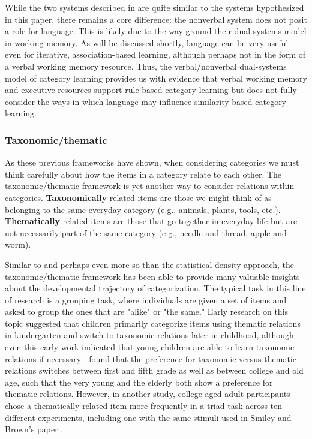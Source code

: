 \documentclass[../dissertation.tex]{subfiles}
\begin{document}
	While the two systems described in \citet{Minda2010} are quite similar to the systems hypothesized in this paper, there remains a core difference: the nonverbal system does not posit a role for language. This is likely due to the way \citet{Minda2010} ground their dual-systems model in working memory. As will be discussed shortly, language can be very useful even for iterative, association-based learning, although perhaps not in the form of a verbal working memory resource. Thus, the verbal/nonverbal dual-systems model of category learning provides us with evidence that verbal working memory and executive resources support rule-based category learning but does not fully consider the ways in which language may influence similarity-based category learning. 
	
\subsubsection{Taxonomic/thematic}
	As these previous frameworks have shown, when considering categories we must think carefully about how the items in a category relate to each other. The taxonomic/thematic framework is yet another way to consider relations within categories. \textbf{Taxonomically} related items are those we might think of as belonging to the same everyday category (e.g., animals, plants, tools, etc.). \textbf{Thematically} related items are those that go together in everyday life but are not necessarily part of the same category (e.g., needle and thread, apple and worm).  \par
	Similar to and perhaps even more so than the statistical density approach, the taxonomic/thematic framework has been able to provide many valuable insights about the developmental trajectory of categorization. The typical task in this line of research is a grouping task, where individuals are given a set of items and asked to group the ones that are "alike" or "the same." Early research on this topic suggested that children primarily categorize items using thematic relations in kindergarten and switch to taxonomic relations later in childhood, although even this early work indicated that young children are able to learn taxonomic relations if necessary \citep{vygotsky1962language,piaget1964early}. \citet{Smiley1979} found that the preference for taxonomic versus thematic relations switches between first and fifth grade as well as between college and old age, such that the very young and the elderly both show a preference for thematic relations. However, in another study, college-aged adult participants chose a thematically-related item more frequently in a triad task across ten different experiments, including one with the same stimuli used in Smiley and Brown's paper \citep{Lin2001}. \par
\end{document}
